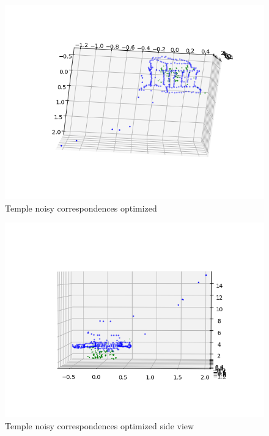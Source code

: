 \documentclass[12pt]{article}
\begin{document}
\begin{figure}[H]
\centering
\includegraphics[page=1,width=1\textwidth]{q5_3c}
\caption{Temple noisy correspondences optimized } 
\label{fig:opt}
\end{figure}   

\begin{figure}[H]
\centering
\includegraphics[page=1,width=1\textwidth]{q5_3d}
\caption{Temple noisy correspondences optimized side view} 
\label{fig:optside}
\end{figure}   
\end{document}
